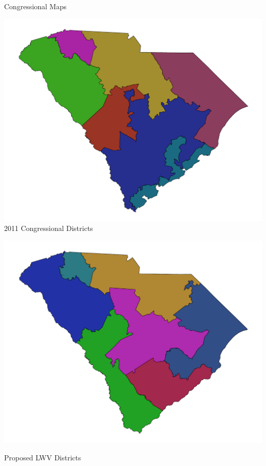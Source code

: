 \documentclass[xcolor=dvipsnames,table]{beamer}
\theoremstyle{plain}
\theoremstyle{definition}
\begin{document}
\begin{frame}{Congressional Maps}

\begin{minipage}{0.5\textwidth}
\hspace{-8mm}\includegraphics[scale=.25]{Congress2011.pdf}
2011 Congressional Districts
\end{minipage}%
\begin{minipage}{0.5\textwidth}
\hspace{-5mm}\includegraphics[scale=0.25]{Congress2021.pdf}


\hspace{10mm}Proposed LWV Districts
\end{minipage}
\end{frame}
\end{document}
